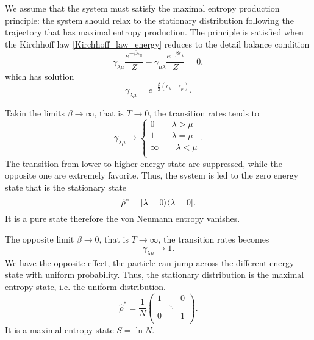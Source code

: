 We assume that the system must satisfy the maximal entropy production principle: the system should relax to the stationary distribution following the trajectory that has maximal entropy production. The principle is satisfied when the Kirchhoff law \eqref{Kirchhoff_law_energy} reduces to the detail balance condition
\begin{equation}
    \gamma_{\lambda\mu}\frac{e^{-\beta \epsilon_\mu}}{Z} - \gamma_{\mu\lambda}\frac{e^{-\beta \epsilon_\lambda}}{Z} = 0,
\end{equation}
which has solution
\begin{equation}\label{gamma_detailed_balance}
    \gamma_{\lambda\mu} = e^{-\frac{\beta}{2}\left(\epsilon_\lambda - \epsilon_\mu\right)}.
\end{equation}

Takin the limits $\beta \rightarrow \infty$, that is $T  \rightarrow 0$, the transition rates tends to
\begin{equation}
    \gamma_{\lambda\mu} \rightarrow \left\{\begin{aligned}
        0 \qquad \lambda > \mu\\
        1 \qquad \lambda = \mu\\
        \infty \qquad  \lambda < \mu \\
    \end{aligned}\right. . 
\end{equation}
The transition from lower to higher energy state are suppressed, while the opposite one are extremely favorite. Thus, the system is led to the zero energy state that is the stationary state
\begin{equation}\label{beta_inf_stationary_distribution}
    \hat\rho^* = \lvert\lambda = 0\rangle\langle\lambda = 0\rvert.
\end{equation} 
It is a pure state therefore the von Neumann entropy vanishes.

The opposite limit $\beta \rightarrow 0$, that is $T \rightarrow \infty$, the transition rates becomes
\begin{equation}
    \gamma_{\lambda\mu} \rightarrow 1.
\end{equation}
We have the opposite effect, the particle can jump across the different energy state with uniform probability. Thus, the stationary distribution is the maximal entropy state, i.e. the uniform distribution.
\begin{equation}
    \hat\rho^* = \frac{1}{N}\begin{pmatrix}
        1&&0\\
        &\ddots&\\
        0&&1\\
    \end{pmatrix}.
\end{equation}
It is a maximal entropy state $S = \ln N$.

